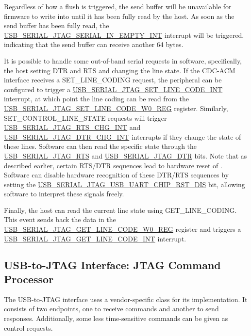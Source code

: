 \documentclass[main\_\_EN.tex]{subfiles}
\begin{document}
Regardless of how a flush is triggered, the send buffer will be unavailable for firmware to write into until it has been fully read by the host. As soon as the send buffer has been fully read, the \hyperref[fielddesc:USBSERIALJTAGSERIALINEMPTYINTRAW]{USB\_SERIAL\_JTAG\_SERIAL\_IN\_EMPTY\_INT} interrupt will be triggered, indicating that the send buffer can receive another 64 bytes.

It is possible to handle some out-of-band serial requests in software, specifically, the host setting DTR and RTS and changing the line state. If the CDC-ACM interface receives a SET\_LINE\_CODING request, the peripheral can be configured to trigger a \hyperref[int:USBSERIALJTAGSETLINECODEINT]{USB\_SERIAL\_JTAG\_SET\_LINE\_CODE\_INT} interrupt, at which point the line coding can be read from the \hyperref[regdesc:USBSERIALJTAGSETLINECODEW0REG]{USB\_SERIAL\_JTAG\_SET\_LINE\_CODE\_W0\_REG} register. Similarly, SET\_CONTROL\_LINE\_STATE requests will trigger \hyperref[int:USBSERIALJTAGRTSCHGINT]{USB\_SERIAL\_JTAG\_RTS\_CHG\_INT} and \hyperref[int:USBSERIALJTAGDTRCHGINT]{USB\_SERIAL\_JTAG\_DTR\_CHG\_INT} interrupts if they change the state of these lines. Software can then read the specific state through the \hyperref[fielddesc:USBSERIALJTAGRTS]{USB\_SERIAL\_JTAG\_RTS} and \hyperref[fielddesc:USBSERIALJTAGDTR]{USB\_SERIAL\_JTAG\_DTR} bits. Note that as described earlier, certain RTS/DTR sequences lead to hardware reset of \chipname{}. Software can disable hardware recognition of these DTR/RTS sequences by setting the \hyperref[fielddesc:USBSERIALJTAGUSBUARTCHIPRSTDIS]{USB\_SERIAL\_JTAG\_USB\_UART\_CHIP\_RST\_DIS} bit, allowing software to interpret these signals freely.

Finally, the host can read the current line state using GET\_LINE\_CODING. This event sends back the data in the \hyperref[regdesc:USBSERIALJTAGGETLINECODEW0REG]{USB\_SERIAL\_JTAG\_GET\_LINE\_CODE\_W0\_REG} register and triggers a \hyperref[int:USBSERIALJTAGGETLINECODEINT]{USB\_SERIAL\_JTAG\_GET\_LINE\_CODE\_INT} interrupt.

\subsection{USB-to-JTAG Interface: JTAG Command Processor}

The USB-to-JTAG interface uses a vendor-specific class for its implementation. It consists of two endpoints, one to receive commands and another to send responses. Additionally, some less time-sensitive commands can be given as control requests.
\end{document}
